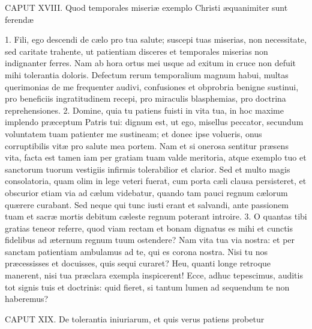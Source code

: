\documentclass[twoside]{article}
\begin{document}
CAPUT XVIII.
Quod temporales miseriæ exemplo Christi æquanimiter sunt ferendæ

1. Fili, ego descendi de cælo pro tua salute; suscepi tuas miserias, non necessitate, sed caritate trahente, ut patientiam disceres et temporales miserias non indignanter ferres. Nam ab hora ortus mei usque ad exitum in cruce non defuit mihi tolerantia doloris. Defectum rerum temporalium magnum habui, multas querimonias de me frequenter audivi, confusiones et obprobria benigne sustinui, pro beneficiis ingratitudinem recepi, pro miraculis blasphemias, pro doctrina reprehensiones.
2. Domine, quia tu patiens fuisti in vita tua, in hoc maxime implendo præceptum Patris tui: dignum est, ut ego, misellus peccator, secundum voluntatem tuam patienter me sustineam; et donec ipse volueris, onus corruptibilis vitæ pro salute mea portem. Nam et si onerosa sentitur præsens vita, facta est tamen iam per gratiam tuam valde meritoria, atque exemplo tuo et sanctorum tuorum vestigiis infirmis tolerabilior et clarior. Sed et multo magis consolatoria, quam olim in lege veteri fuerat, cum porta cæli clausa persisteret, et obscurior etiam via ad cælum videbatur, quando tam pauci regnum cælorum quærere curabant. Sed neque qui tunc iusti erant et salvandi, ante passionem tuam et sacræ mortis debitum cæleste regnum poterant introire.
3. O quantas tibi gratias teneor referre, quod viam rectam et bonam dignatus es mihi et cunctis fidelibus ad æternum regnum tuum ostendere? Nam vita tua via nostra: et per sanctam patientiam ambulamus ad te, qui es corona nostra. Nisi tu nos præcessisses et docuisses, quis sequi curaret? Heu, quanti longe retroque manerent, nisi tua præclara exempla inspicerent! Ecce, adhuc tepescimus, auditis tot signis tuis et doctrinis: quid fieret, si tantum lumen ad sequendum te non haberemus?


CAPUT XIX.
De tolerantia iniuriarum, et quis verus patiens probetur
\end{document}

